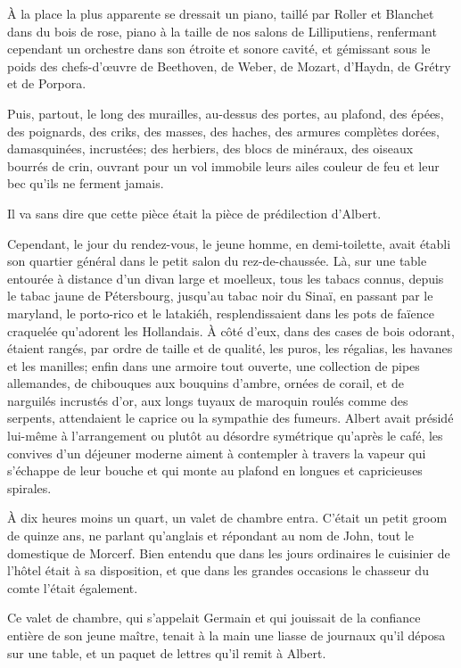 À la place la plus apparente se dressait un piano, taillé par Roller et Blanchet dans du bois de rose, piano à la taille de nos salons de Lilliputiens, renfermant cependant un orchestre dans son étroite et sonore cavité, et gémissant sous le poids des chefs-d'œuvre de Beethoven, de Weber, de Mozart, d'Haydn, de Grétry et de Porpora. 

Puis, partout, le long des murailles, au-dessus des portes, au plafond, des épées, des poignards, des criks, des masses, des haches, des armures complètes dorées, damasquinées, incrustées; des herbiers, des blocs de minéraux, des oiseaux bourrés de crin, ouvrant pour un vol immobile leurs ailes couleur de feu et leur bec qu'ils ne ferment jamais. 

Il va sans dire que cette pièce était la pièce de prédilection d'Albert. 

Cependant, le jour du rendez-vous, le jeune homme, en demi-toilette, avait établi son quartier général dans le petit salon du rez-de-chaussée. Là, sur une table entourée à distance d'un divan large et moelleux, tous les tabacs connus, depuis le tabac jaune de Pétersbourg, jusqu'au tabac noir du Sinaï, en passant par le maryland, le porto-rico et le latakiéh, resplendissaient dans les pots de faïence craquelée qu'adorent les Hollandais. À côté d'eux, dans des cases de bois odorant, étaient rangés, par ordre de taille et de qualité, les puros, les régalias, les havanes et les manilles; enfin dans une armoire tout ouverte, une collection de pipes allemandes, de chibouques aux bouquins d'ambre, ornées de corail, et de narguilés incrustés d'or, aux longs tuyaux de maroquin roulés comme des serpents, attendaient le caprice ou la sympathie des fumeurs. Albert avait présidé lui-même à l'arrangement ou plutôt au désordre symétrique qu'après le café, les convives d'un déjeuner moderne aiment à contempler à travers la vapeur qui s'échappe de leur bouche et qui monte au plafond en longues et capricieuses spirales. 

À dix heures moins un quart, un valet de chambre entra. C'était un petit groom de quinze ans, ne parlant qu'anglais et répondant au nom de John, tout le domestique de Morcerf. Bien entendu que dans les jours ordinaires le cuisinier de l'hôtel était à sa disposition, et que dans les grandes occasions le chasseur du comte l'était également. 

Ce valet de chambre, qui s'appelait Germain et qui jouissait de la confiance entière de son jeune maître, tenait à la main une liasse de journaux qu'il déposa sur une table, et un paquet de lettres qu'il remit à Albert. 


